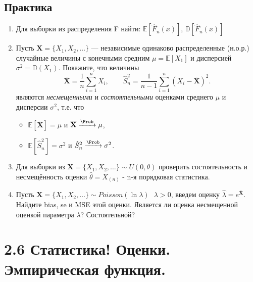 \documentclass[a4paper, 14pt]{extarticle}
\begin{document}
\subsection*{Практика}
\begin{enumerate}


\item Для выборки из распределения F  найти: $\mathbb{E}[\hat F_n(x)]$, $\mathbb{D}[\hat F_n(x)]$

\item Пусть $\textbf{X} = \{X_1, X_2, \dots\}$ --- независимые одинаково распределенные (н.о.р.) случайные величины  с конечными средним 
$\mu = \mathbb{E}[X_1]$ и 
дисперсией $\sigma^2 = \mathbb{D}(X_1)$. Покажите, что величины
$$
\overline{\textbf{X}} = \frac{1}{n}\sum_{i=1}^n X_i, \qquad \hat S^2_n = \frac{1}{n - 1} \sum_{i=1}^n (X_i - \overline{\textbf{X}})^2.
$$
являются \textit{несмещенными} и \textit{состоятельными} оценками среднего $\mu$ и дисперсии $\sigma^2$, т.е. что
\begin{itemize}
	\item $\mathbb{E}[\overline{\textbf{X}}] = \mu$ и $\overline{\textbf{X}} \xrightarrow{\Prob} \mu$,
	\item $\mathbb{E}[\hat S^2_n] = \sigma^2$ и $\hat S^2_n \xrightarrow{\Prob} \sigma^2$.
\end{itemize}

\item Для выборки из $\textbf{X} = \{X_1, X_2, \dots\} \sim U(0, \theta)$ проверить состоятельность и несмещённость оценки $\hat\theta = X_{(n)}$ - n-я порядковая статистика.

\item Пусть $\textbf{X} = \{X_1, X_2, \dots\} \sim Poisson(\ln{\lambda})~~~\lambda>0$, введем оценку $\hat\lambda = e^{\overline{\textbf{X}}}$. Найдите bias, se и MSE этой оценки. Является
ли оценка несмещенной оценкой параметра $\lambda$? Состоятельной?



\end{enumerate}
\newpage
\section*{2.6 Статистика! Оценки. Эмпирическая функция.}
\end{document}
